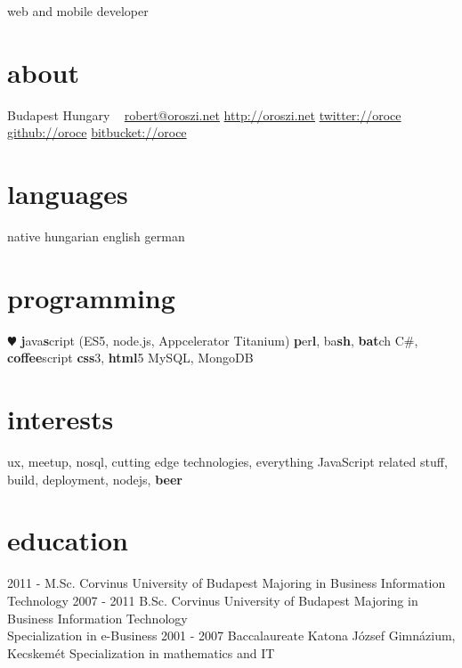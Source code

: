 \documentclass[]{k-cv}
\begin{document}
       {web and mobile developer}

\begin{aside}
  \section{about}
    Budapest
    Hungary
    ~
    \href{mailto:robert@oroszi.net}{robert@oroszi.net}
    \href{http://oroszi.net}{http://oroszi.net}
    \href{http://twitter.com/oroce}{twitter://oroce}
	\href{http://github.com/oroce}{github://oroce}
	\href{http://bitbucket.org/oroce}{bitbucket://oroce}
  \section{languages}
    native hungarian
	english
	german
  \section{programming}
    {\color{red} $\varheartsuit$} \textbf{j}ava\textbf{s}cript
    (ES5, node.js, Appcelerator Titanium)
    \textbf{p}er\textbf{l}, ba\textbf{sh}, \textbf{bat}ch C\#, \textbf{coffee}script
    \textbf{css}3, \textbf{html}5
	MySQL, MongoDB
\end{aside}

\section{interests}

ux, meetup, nosql, cutting edge technologies, everything JavaScript related stuff, build, deployment, nodejs, \textbf{beer}

\section{education}

\begin{entrylist}
  \entry
    {2011 - }
    {M.Sc.}
    {Corvinus University of Budapest}
	{Majoring in Business Information Technology}
  \entry
    {2007 - 2011}
    {B.Sc.}
    {Corvinus University of Budapest}
	{Majoring in Business Information Technology\\
	Specialization in e-Business}
  \entry
    {2001 - 2007}
    {Baccalaureate}
    {Katona József Gimnázium, Kecskemét}
    {Specialization in mathematics and IT}
		
\end{entrylist}
\end{document}
